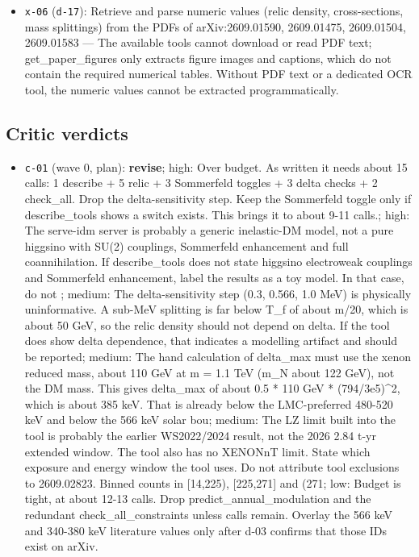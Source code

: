 \documentclass[11pt,a4paper]{article}
\begin{document}
\begin{itemize}
  \item \texttt{x-06} (\texttt{d-17}): Retrieve and parse numeric values (relic density, cross-sections, mass splittings) from the PDFs of arXiv:2609.01590, 2609.01475, 2609.01504, 2609.01583 --- The available tools cannot download or read PDF text; get\_paper\_figures only extracts figure images and captions, which do not contain the required numerical tables. Without PDF text or a dedicated OCR tool, the numeric values cannot be extracted programmatically.
\end{itemize}
\subsection{Critic verdicts}
\begin{itemize}
  \item \texttt{c-01} (wave 0, plan): \textbf{revise}; high: Over budget. As written it needs about 15 calls: 1 describe + 5 relic + 3 Sommerfeld toggles + 3 delta checks + 2 check\_all. Drop the delta-sensitivity step. Keep the Sommerfeld toggle only if describe\_tools shows a switch exists. This brings it to about 9-11 calls.; high: The serve-idm server is probably a generic inelastic-DM model, not a pure higgsino with SU(2) couplings, Sommerfeld enhancement and full coannihilation. If describe\_tools does not state higgsino electroweak couplings and Sommerfeld enhancement, label the results as a toy model. In that case, do not ; medium: The delta-sensitivity step (0.3, 0.566, 1.0 MeV) is physically uninformative. A sub-MeV splitting is far below T\_f of about m/20, which is about 50 GeV, so the relic density should not depend on delta. If the tool does show delta dependence, that indicates a modelling artifact and should be reported; medium: The hand calculation of delta\_max must use the xenon reduced mass, about 110 GeV at m = 1.1 TeV (m\_N about 122 GeV), not the DM mass. This gives delta\_max of about 0.5 * 110 GeV * (794/3e5)\textasciicircum{}2, which is about 385 keV. That is already below the LMC-preferred 480-520 keV and below the 566 keV solar bou; medium: The LZ limit built into the tool is probably the earlier WS2022/2024 result, not the 2026 2.84 t-yr extended window. The tool also has no XENONnT limit. State which exposure and energy window the tool uses. Do not attribute tool exclusions to 2609.02823. Binned counts in [14,225), [225,271] and (271; low: Budget is tight, at about 12-13 calls. Drop predict\_annual\_modulation and the redundant check\_all\_constraints unless calls remain. Overlay the 566 keV and 340-380 keV literature values only after d-03 confirms that those IDs exist on arXiv.

\end{itemize}
\end{document}
